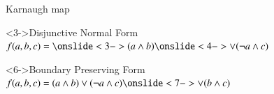 \documentclass[10pt, xcolor={usenames, dvipsnames}]{beamer}
\begin{document}
\begin{frame}[fragile]{Karnaugh map}
\begin{center}
\begin{minipage}[t]{.65\textwidth}
                    \vspace{-8mm}
                    \begin{block}<3->{Disjunctive Normal Form}
                        \vspace{2.5mm}
                        \centering
                        $f(a, b, c) = \onslide<3->{(a \land b)} \onslide<4->{\lor (\lnot a \land c)}$
                    \end{block}
                    \begin{block}<6->{Boundary Preserving Form}
                        \vspace{2.5mm}
                        \centering
                        $f(a, b, c) = (a \land b) \lor (\lnot a \land c) \onslide<7->{\lor (b \land c)}$
                    \end{block}
                \end{minipage}
            \end{center}
        \end{frame}
\end{document}
